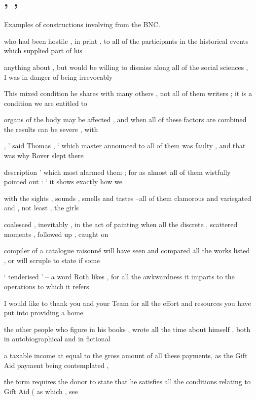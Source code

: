 \documentclass[11pt,a4paper]{article}
\begin{document}
\newpage


\appendix
\newpage
\section{, , }\label{APP:ALL}

Examples of constructions involving  from the BNC.

\begin{examples}
\item
\begin{examples}
\item who had been hostile , in print , to all of the participants in the historical events which supplied part of his 
\item anything about , but would be willing to dismiss along all of the social sciences , I was in danger of being irrevocably 
\item This mixed condition he shares with many others , not all of them writers ; it is a condition we are entitled to 
\item organs of the body may be affected , and when all of these factors are combined the results can be severe , with 
\item , ' said Thomas , ` which master announced to all of them was faulty , and that was why Rover slept there 
\item description ' which most alarmed them ; for as almost all of them wistfully pointed out : ` it shows exactly how we 
\item with the sights , sounds , smells and tastes --all of them clamorous and variegated and , not least , the girls 
\end{examples}

\item
\begin{examples}
\item coalesced , inevitably , in the act of painting when all the discrete , scattered moments , followed up , caught on 
\item compiler of a catalogue raisonn\'{e} will have seen and compared all the works listed , or will scruple to state if some 
\item ` tenderised ' -- a word Roth likes , for all the awkwardness it imparts to the operations to which it refers 
\item I would like to thank you and your Team for all the effort and resources you have put into providing a home 
\item the other people who figure in his books , wrote all the time about himself , both in autobiographical and in fictional 
\item a taxable income at equal to the gross amount of all these payments, as the Gift Aid payment being contemplated , 
\item the form requires the donor to state that he satisfies all the conditions relating to Gift Aid ( as which , see 
\end{examples}


\end{examples}
\end{document}
